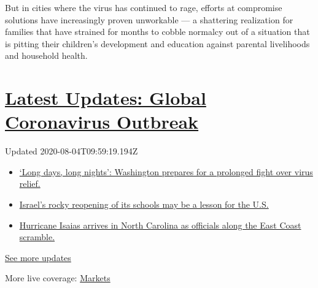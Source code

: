 But in cities where the virus has continued to rage, efforts at
compromise solutions have increasingly proven unworkable --- a
shattering realization for families that have strained for months to
cobble normalcy out of a situation that is pitting their children's
development and education against parental livelihoods and household
health.

\hypertarget{latest-updates-global-coronavirus-outbreak}{%
\section{\texorpdfstring{\href{https://www.nytimes3xbfgragh.onion/2020/08/04/world/coronavirus-covid-19.html?action=click\&pgtype=Article\&state=default\&region=MAIN_CONTENT_1\&context=storylines_live_updates}{Latest
Updates: Global Coronavirus
Outbreak}}{Latest Updates: Global Coronavirus Outbreak}}\label{latest-updates-global-coronavirus-outbreak}}

Updated 2020-08-04T09:59:19.194Z

\begin{itemize}
\tightlist
\item
  \href{https://www.nytimes3xbfgragh.onion/2020/08/04/world/coronavirus-covid-19.html?action=click\&pgtype=Article\&state=default\&region=MAIN_CONTENT_1\&context=storylines_live_updates\#link-6b644638}{`Long
  days, long nights': Washington prepares for a prolonged fight over
  virus relief.}
\item
  \href{https://www.nytimes3xbfgragh.onion/2020/08/04/world/coronavirus-covid-19.html?action=click\&pgtype=Article\&state=default\&region=MAIN_CONTENT_1\&context=storylines_live_updates\#link-7af9fca0}{Israel's
  rocky reopening of its schools may be a lesson for the U.S.}
\item
  \href{https://www.nytimes3xbfgragh.onion/2020/08/04/world/coronavirus-covid-19.html?action=click\&pgtype=Article\&state=default\&region=MAIN_CONTENT_1\&context=storylines_live_updates\#link-33bf9168}{Hurricane
  Isaias arrives in North Carolina as officials along the East Coast
  scramble.}
\end{itemize}

\href{https://www.nytimes3xbfgragh.onion/2020/08/04/world/coronavirus-covid-19.html?action=click\&pgtype=Article\&state=default\&region=MAIN_CONTENT_1\&context=storylines_live_updates}{See
more updates}

More live coverage:
\href{https://www.nytimes3xbfgragh.onion/live/2020/08/03/business/stock-market-today-coronavirus?action=click\&pgtype=Article\&state=default\&region=MAIN_CONTENT_1\&context=storylines_live_updates}{Markets}

